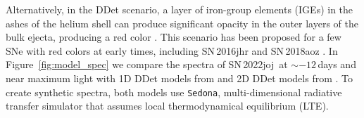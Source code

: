 \documentclass[twocolumn]{aastex631}
\newcommand{\sn}{SN\,2022joj}
\newcommand{\tfl}{$t_\mathrm{fl}$}
\begin{document}
\begin{CJK*}{UTF8}{gbsn}

Alternatively, in the DDet scenario, a layer of iron-group elements (IGEs) in the ashes of the helium shell can produce significant opacity in the outer layers of the bulk ejecta, producing a red color \citep{polin_observational_2019}. This scenario has been proposed for a few SNe with red colors at early times, including SN\,2016jhr \citep{jiang_16jhr_2017} and SN\,2018aoz \citep{Ni_2022}. In Figure~\ref{fig:model_spec} we compare the spectra of \sn\ at $\sim$$-12$\,days and near maximum light with 1D DDet models from \citet{polin_observational_2019} and 2D DDet models from \citet{Shen_2D_2021}. To create synthetic spectra, both models use \texttt{Sedona}, multi-dimensional radiative transfer simulator that assumes local thermodynamical equilibrium (LTE).


\end{CJK*}
\end{document}

